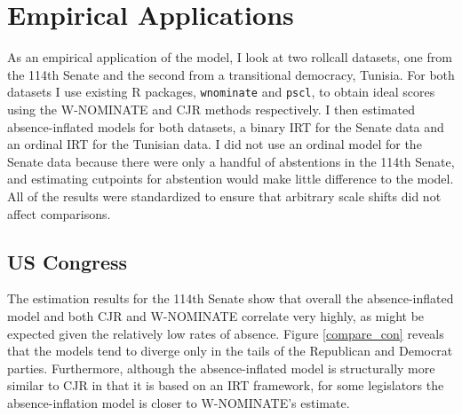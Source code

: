 	
	\section{Empirical Applications}
	
	As an empirical application of the model, I look at two rollcall datasets, one from the 114th Senate and the second from a transitional democracy, Tunisia. For both datasets I use existing R packages, \texttt{wnominate} and \texttt{pscl}, to obtain ideal scores using the W-NOMINATE and CJR methods respectively. I then estimated absence-inflated models for both datasets, a binary IRT for the Senate data and an ordinal IRT for the Tunisian data. I did not use an ordinal model for the Senate data because there were only a handful of abstentions in the 114th Senate, and estimating cutpoints for abstention would make little difference to the model. All of the results were standardized to ensure that arbitrary scale shifts did not affect comparisons.
	
	\subsection{US Congress}
	
	The estimation results for the 114th Senate show that overall the absence-inflated model and both CJR and W-NOMINATE correlate very highly, as might be expected given the relatively low rates of absence. Figure \ref{compare_con} reveals that the models tend to diverge only in the tails of the Republican and Democrat parties. Furthermore, although the absence-inflated model is structurally more similar to CJR in that it is based on an IRT framework, for some legislators the absence-inflation model is closer to W-NOMINATE's estimate. 
	
